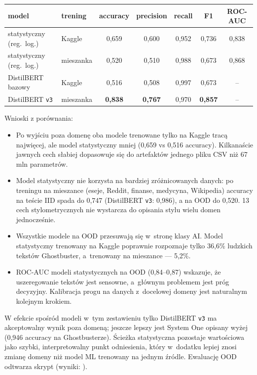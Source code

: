 \begin{center}
\small
\begin{tabular}{|l|l|c|c|c|c|c|}
\hline
model & trening & accuracy & precision & recall & F1 & ROC-AUC \\
\hline
statystyczny (reg.\ log.) & Kaggle & 0,659 & 0,600 & 0,952 & 0,736 & 0,838 \\
statystyczny (reg.\ log.) & mieszanka & 0,520 & 0,510 & 0,988 & 0,673 & 0,868 \\
DistilBERT bazowy & Kaggle & 0,516 & 0,508 & 0,997 & 0,673 & -- \\
DistilBERT \texttt{v3} & mieszanka & \textbf{0,838} & \textbf{0,767} & 0,970 & \textbf{0,857} & -- \\
\hline
\end{tabular}
\end{center}

Wnioski z porównania:
\begin{itemize}
	\item Po wyjściu poza domenę oba modele trenowane tylko na Kaggle tracą
	najwięcej, ale model statystyczny mniej (0,659 vs 0,516 accuracy). Kilkanaście
	jawnych cech słabiej dopasowuje się do artefaktów jednego pliku CSV niż
	67 mln parametrów.
	\item Model statystyczny nie korzysta na bardziej zróżnicowanych danych: po
	treningu na mieszance (eseje, Reddit, finanse, medycyna, Wikipedia) accuracy
	na teście IID spada do 0,747 (DistilBERT \texttt{v3}: 0,986), a na OOD do 0,520.
	13 cech stylometrycznych nie wystarcza do opisania stylu wielu domen jednocześnie.
	\item Wszystkie modele na OOD przesuwają się w~stronę klasy AI. Model
	statystyczny trenowany na Kaggle poprawnie rozpoznaje tylko 36,6\% ludzkich
	tekstów Ghostbuster, a~trenowany na mieszance --- 5,2\%.
	\item ROC-AUC modeli statystycznych na OOD (0,84--0,87) wskazuje, że
	uszeregowanie tekstów jest sensowne, a~głównym problemem jest próg
	decyzyjny. Kalibracja progu na danych z~docelowej domeny jest naturalnym
	kolejnym krokiem.
\end{itemize}

W efekcie spośród modeli w~tym zestawieniu tylko DistilBERT \texttt{v3} ma
akceptowalny wynik poza domeną; jeszcze lepszy jest System One opisany wyżej
(0,946 accuracy na Ghostbusterze). Ścieżka statystyczna pozostaje wartościowa jako szybki,
interpretowalny punkt odniesienia, który w~dodatku lepiej znosi zmianę domeny
niż model ML trenowany na jednym źródle. Ewaluację OOD odtwarza skrypt
 (wyniki: ).
